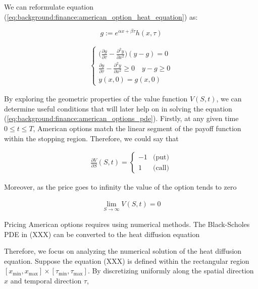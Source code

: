 We can reformulate equation (\ref*{eq:background:finance:american_option_heat_equation})
as:

\begin{equation}
  g := e^{\alpha x + \beta \tau}h(x, \tau)
\end{equation}

\begin{align}
  \begin{cases}
    \big(\frac{\partial y}{\partial \tau} - \frac{\partial^2 y}{\partial x^2}\big)(y  - g) =0 \\
    \frac{\partial y}{\partial \tau} - \frac{\partial^2 y}{\partial x^2} \ge 0 \quad y - g \ge 0 \\
    y(x, 0) = g(x, 0)
  \end{cases}
\end{align}


By exploring the geometric properties of the value function $V(S,t)$, 
we can determine useful conditions that will later help on in solving the equation 
(\ref*{eq:background:finance:american_options_pde}). Firstly, at
any given time $0 \le t \le T$, American options match the linear segment of the payoff
function within the stopping region. Therefore, we could say that 

\begin{align}
  \frac{\partial V}{\partial S}(S, t) =  \begin{cases}
    -1 & \text{(put)} \\ 
    1 & \text{(call)}
  \end{cases}
  \label{eq:background:finance:american_option_left_boundary}
\end{align}

Moreover, as the price goes to infinity the value of the option tends to zero

\begin{align}
  \lim_{S \rightarrow \infty}V(S, t) = 0 
  \label{eq:background:finance:american_option_stopping_right_boundary}
\end{align}



Pricing American options requires using numerical methods. The Black-Scholes PDE 
in (XXX) can be converted to the heat diffusion equation


Therefore, we focus on analyzing the numerical solution of the heat diffusion equation. 
Suppose the equation (XXX) is defined within the rectangular region $[x_{\text{min}}, x_{\text{max}}]\times[\tau_{\text{min}}, \tau_{\text{max}}]$.
By discretizing uniformly along the spatial direction $x$ and temporal direction $\tau$,

